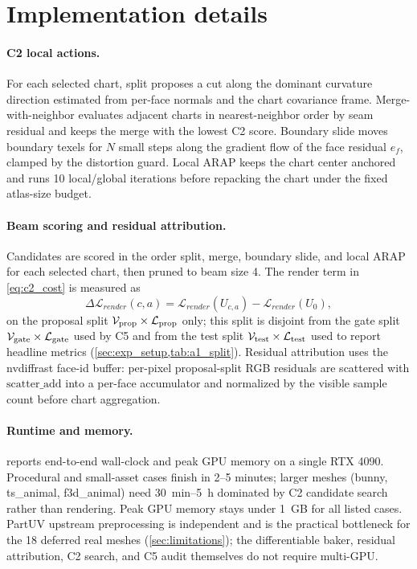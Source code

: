 \section{Implementation details}
\label{app:implementation}

\paragraph*{C2 local actions.}
For each selected chart, split proposes a cut along the dominant curvature direction estimated from per-face normals and the chart covariance frame. Merge-with-neighbor evaluates adjacent charts in nearest-neighbor order by seam residual and keeps the merge with the lowest C2 score. Boundary slide moves boundary texels for \(N\) small steps along the gradient flow of the face residual \(e_f\), clamped by the distortion guard. Local ARAP keeps the chart center anchored and runs 10 local/global iterations before repacking the chart under the fixed atlas-size budget.

\paragraph*{Beam scoring and residual attribution.}
Candidates are scored in the order split, merge, boundary slide, and local ARAP for each selected chart, then pruned to beam size 4. The render term in \cref{eq:c2_cost} is measured as
\begin{equation}
\Delta\mathcal{L}_{render}(c,a)=
\mathcal{L}_{render}(U_{c,a})-\mathcal{L}_{render}(U_0),
\end{equation}
on the proposal split $\mathcal{V}_{\mathrm{prop}} \times \mathcal{L}_{\mathrm{prop}}$ only; this split is disjoint from the gate split $\mathcal{V}_{\mathrm{gate}} \times \mathcal{L}_{\mathrm{gate}}$ used by C5 and from the test split $\mathcal{V}_{\mathrm{test}} \times \mathcal{L}_{\mathrm{test}}$ used to report headline metrics (\cref{sec:exp_setup,tab:a1_split}). Residual attribution uses the nvdiffrast face-id buffer: per-pixel proposal-split RGB residuals are scattered with \(\mathrm{scatter\_add}\) into a per-face accumulator and normalized by the visible sample count before chart aggregation.

\paragraph*{Runtime and memory.}

 reports end-to-end wall-clock and peak GPU memory on a single RTX 4090. Procedural and small-asset cases finish in 2--5 minutes; larger meshes (bunny, ts\_animal, f3d\_animal) need 30~min--5~h dominated by C2 candidate search rather than rendering. Peak GPU memory stays under 1~GB for all listed cases. PartUV upstream preprocessing is independent and is the practical bottleneck for the 18 deferred real meshes (\cref{sec:limitations}); the differentiable baker, residual attribution, C2 search, and C5 audit themselves do not require multi-GPU.

